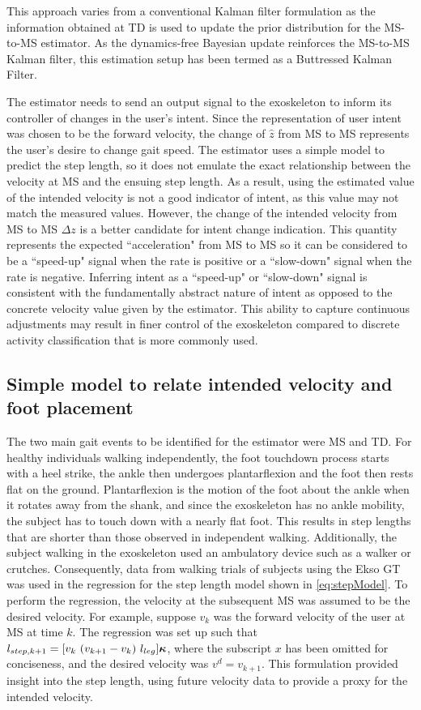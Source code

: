 This approach varies from a conventional Kalman filter formulation as the information obtained at TD is used to update the prior distribution for the MS-to-MS estimator. As the dynamics-free Bayesian update reinforces the MS-to-MS Kalman filter, this estimation setup has been termed as a Buttressed Kalman Filter.

The estimator needs to send an output signal to the exoskeleton to inform its controller of changes in the user's intent. Since the representation of user intent was chosen to be the forward velocity, the change of $ \hat{z} $ from MS to MS represents the user's desire to change gait speed. The estimator uses a simple model to predict the step length, so it does not emulate the exact relationship between the velocity at MS and the ensuing step length. As a result, using the estimated value of the intended velocity is not a good indicator of intent, as this value may not match the measured values. However, the change of the intended velocity from MS to MS $ \Delta z $ is a better candidate for intent change indication. This quantity represents the expected ``acceleration" from MS to MS so it can be considered to be a ``speed-up" signal when the rate is positive or a ``slow-down" signal when the rate is negative. Inferring intent as a ``speed-up" or ``slow-down" signal is consistent with the fundamentally abstract nature of intent as opposed to the concrete velocity value given by the estimator. This ability to capture continuous adjustments may result in finer control of the exoskeleton compared to discrete activity classification that is more commonly used.

\subsection{Simple model to relate intended velocity and foot placement}

The two main gait events to be identified for the estimator were MS and TD. For healthy individuals walking independently, the foot touchdown process starts with a heel strike, the ankle then undergoes plantarflexion and the foot then rests flat on the ground. Plantarflexion is the motion of the foot about the ankle when it rotates away from the shank, and since the exoskeleton has no ankle mobility, the subject has to touch down with a nearly flat foot. This results in step lengths that are shorter than those observed in independent walking. Additionally, the subject walking in the exoskeleton used an ambulatory device such as a walker or crutches. Consequently, data from walking trials of subjects using the Ekso GT \cite{exoWalkerData} was used in the regression for the step length model shown in \eqref{eq:stepModel}. To perform the regression, the velocity at the subsequent MS was assumed to be the desired velocity. For example, suppose $ v_k $ was the forward velocity of the user at MS at time $ k $. The regression was set up such that $ l_{step,{k+1}} = [v_{k}\ (v_{k+1}-v_{k})\ l_{leg}] \boldsymbol{\kappa} $, where the subscript $ x $ has been omitted for conciseness, and the desired velocity was $ v^d = v_{k+1} $. This formulation provided insight into the step length, using future velocity data to provide a proxy for the intended velocity.

